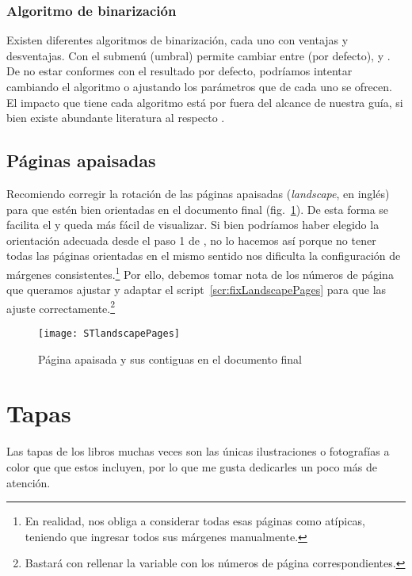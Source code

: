 \documentclass[%
	a5paper,
	10pt,
	twoside,
	openright,
	final,
]{memoir}
\begin{document}
	\subsubsection{Algoritmo de binarización} Existen diferentes algoritmos de binarización, cada uno con ventajas y desventajas. Con el submenú  (umbral) \scantailor permite cambiar entre  (por defecto),  y . De no estar conformes con el resultado por defecto, podríamos intentar cambiando el algoritmo o ajustando los parámetros que de cada uno se ofrecen. El impacto que tiene cada algoritmo está por fuera del alcance de nuestra guía, si bien existe abundante literatura al respecto \cite{RashmiBinarization}.

	\subsection{Páginas apaisadas\label{sec:landscapePages}} Recomiendo corregir la rotación de las páginas apaisadas (\emph{landscape}, en inglés) para que estén bien orientadas en el documento final (fig.~\ref{fig:STlandscapePages}). De esta forma se facilita el \ocr y queda más fácil de visualizar. Si bien podríamos haber elegido la orientación adecuada desde el paso 1 de \scantailor, no lo hacemos así porque no tener todas las páginas orientadas en el mismo sentido nos dificulta la configuración de márgenes consistentes.\footnote{En realidad, nos obliga a considerar todas esas páginas como atípicas, teniendo que ingresar todos sus márgenes manualmente.} Por ello, debemos tomar nota de los números de página que queramos ajustar y adaptar el script~\ref{scr:fixLandscapePages} para que las ajuste correctamente.\footnote{Bastará con rellenar la variable  con los números de página correspondientes.}

	\begin{figure}
		\texttt{[image: STlandscapePages]}
		\caption{Página apaisada y sus contiguas en el documento final\label{fig:STlandscapePages}}
	\end{figure}



	\section{Tapas\label{sec:covers}} Las tapas de los libros muchas veces son las únicas ilustraciones o fotografías a color que que estos incluyen, por lo que me gusta dedicarles un poco más de atención.
\end{document}
